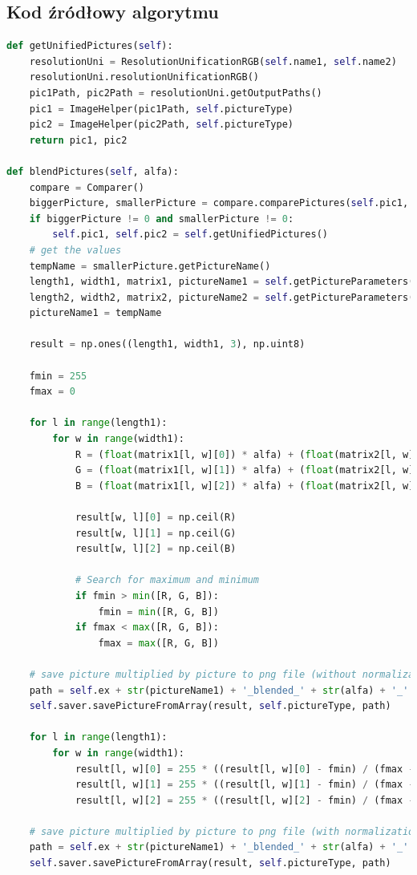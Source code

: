 \documentclass[a4paper,12pt, titlepage]{report}
\begin{document}
\subsection*{Kod źródłowy algorytmu}
\begin{lstlisting}[language=Python]
def getUnifiedPictures(self):
    resolutionUni = ResolutionUnificationRGB(self.name1, self.name2)
    resolutionUni.resolutionUnificationRGB()
    pic1Path, pic2Path = resolutionUni.getOutputPaths()
    pic1 = ImageHelper(pic1Path, self.pictureType)
    pic2 = ImageHelper(pic2Path, self.pictureType)
    return pic1, pic2

def blendPictures(self, alfa):
    compare = Comparer()
    biggerPicture, smallerPicture = compare.comparePictures(self.pic1, self.pic2)
    if biggerPicture != 0 and smallerPicture != 0:
        self.pic1, self.pic2 = self.getUnifiedPictures()
    # get the values
    tempName = smallerPicture.getPictureName()
    length1, width1, matrix1, pictureName1 = self.getPictureParameters(self.pic1)
    length2, width2, matrix2, pictureName2 = self.getPictureParameters(self.pic2)
    pictureName1 = tempName

    result = np.ones((length1, width1, 3), np.uint8)

    fmin = 255
    fmax = 0

    for l in range(length1):
        for w in range(width1):
            R = (float(matrix1[l, w][0]) * alfa) + (float(matrix2[l, w][0]) * (1 - alfa))
            G = (float(matrix1[l, w][1]) * alfa) + (float(matrix2[l, w][1]) * (1 - alfa))
            B = (float(matrix1[l, w][2]) * alfa) + (float(matrix2[l, w][2]) * (1 - alfa))

            result[w, l][0] = np.ceil(R)
            result[w, l][1] = np.ceil(G)
            result[w, l][2] = np.ceil(B)

            # Search for maximum and minimum
            if fmin > min([R, G, B]):
                fmin = min([R, G, B])
            if fmax < max([R, G, B]):
                fmax = max([R, G, B])

    # save picture multiplied by picture to png file (without normalization)
    path = self.ex + str(pictureName1) + '_blended_' + str(alfa) + '_' + str(pictureName2) + '.png'
    self.saver.savePictureFromArray(result, self.pictureType, path)

    for l in range(length1):
        for w in range(width1):
            result[l, w][0] = 255 * ((result[l, w][0] - fmin) / (fmax - fmin))
            result[l, w][1] = 255 * ((result[l, w][1] - fmin) / (fmax - fmin))
            result[l, w][2] = 255 * ((result[l, w][2] - fmin) / (fmax - fmin))

    # save picture multiplied by picture to png file (with normalization)
    path = self.ex + str(pictureName1) + '_blended_' + str(alfa) + '_' + str(pictureName2) + '_normalized.png'
    self.saver.savePictureFromArray(result, self.pictureType, path)
\end{lstlisting}
\end{document}
